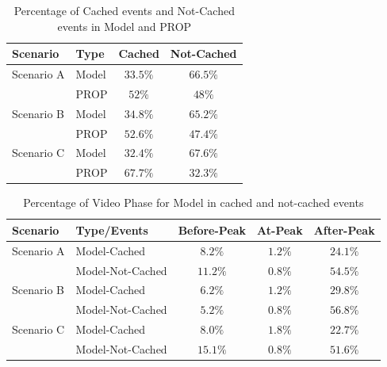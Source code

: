 \documentclass[10pt,final,journal,a4paper]{IEEEtran}
\begin{document}
\begin{table}[!t]
\caption{Percentage of Cached events and Not-Cached events in Model and PROP}
\label{tab:stacked1}
\centering
\begin{tabular}{|l|l|c|c|}
\hline
Scenario & Type & Cached & Not-Cached\\
\hline
Scenario A & Model & $33.5\%$ & $66.5\%$ \\
\hline
 & PROP & $52\%$ & $48\%$  \\
\hline

Scenario B & Model & $34.8\%$ & $65.2\%$ \\
\hline
 & PROP & $52.6\%$ & $47.4\%$  \\
\hline

Scenario C & Model & $32.4\%$ & $67.6\%$  \\
\hline
 & PROP & $67.7\%$ & $32.3\%$ \\
\hline
\end{tabular}
\end{table}


\begin{table}[!t]
\caption{Percentage of Video Phase for Model in cached and not-cached events}
\label{tab:stacked2}
\centering
\begin{tabular}{|l|l|c|c|c|}
\hline
Scenario & Type/Events & Before-Peak & At-Peak & After-Peak\\
\hline
Scenario A & Model-Cached & $8.2\%$ & $1.2\%$ & $24.1\%$ \\
\hline
 & Model-Not-Cached & $11.2\%$ & $0.8\%$ & $54.5\%$ \\
 \hline

Scenario B & Model-Cached & $6.2\%$ & $1.2\%$ & $29.8\%$ \\
\hline
 & Model-Not-Cached & $5.2\%$ & $0.8\%$ & $56.8\%$ \\
\hline

Scenario C & Model-Cached & $8.0\%$ & $1.8\%$ & $22.7\%$ \\
\hline
 & Model-Not-Cached & $15.1\%$ & $0.8\%$ & $51.6\%$ \\
\hline
\end{tabular}
\end{table}
\end{document}
